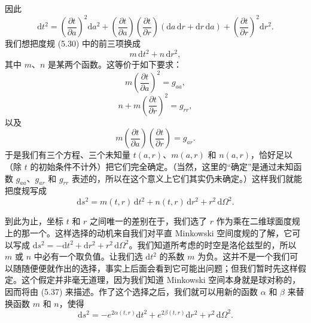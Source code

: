 因此
\begin{equation*}
\mathrm{d}t^2 = \left(\frac{\partial t}{\partial a}\right)^{2}\mathrm{d}a^2 + \left(\frac{\partial t}{\partial a}\right)\left(\frac{\partial t}{\partial r}\right)(\mathrm{d}a\,\mathrm{d}r + \mathrm{d}r\,\mathrm{d}a) + \left(\frac{\partial t}{\partial r}\right)^{2}\mathrm{d}r^2.
\tag{5.32}
\end{equation*}
我们想把度规 (5.30) 中的前三项换成
\begin{equation*}
m\,\mathrm{d}t^2 + n\,\mathrm{d}r^2,
\tag{5.33}
\end{equation*}
其中 $m$、$n$ 是某两个函数。这等价于如下要求：
\begin{equation*}
m\left(\frac{\partial t}{\partial a}\right)^{2} = g_{aa},
\tag{5.34}
\end{equation*}
\begin{equation*}
n + m\left(\frac{\partial t}{\partial r}\right)^{2} = g_{rr},
\tag{5.35}
\end{equation*}
以及
\begin{equation*}
m\left(\frac{\partial t}{\partial a}\right)\left(\frac{\partial t}{\partial r}\right) = g_{ar}.
\tag{5.36}
\end{equation*}
于是我们有三个方程、三个未知量 $t(a, r)$、$m(a, r)$ 和 $n(a, r)$，恰好足以（除 $t$ 的初始条件不计外）把它们完全确定。（当然，这里的“确定”是通过未知函数 $g_{aa}$、$g_{ar}$ 和 $g_{rr}$ 表述的，所以在这个意义上它们其实仍未确定。）这样我们就能把度规写成
\begin{equation*}
\mathrm{d}s^2 = m(t, r)\,\mathrm{d}t^2 + n(t, r)\,\mathrm{d}r^2 + r^2\,\mathrm{d}\Omega^2.
\tag{5.37}
\end{equation*}

到此为止，坐标 $t$ 和 $r$ 之间唯一的差别在于，我们选了 $r$ 作为乘在二维球面度规上的那一个。这样选择的动机来自我们对平直 Minkowski 空间度规的了解，它可以写成 $\mathrm{d}s^2 = -\mathrm{d}t^2 + \mathrm{d}r^2 + r^2\,\mathrm{d}\Omega^2$。我们知道所考虑的时空是洛伦兹型的，所以 $m$ 或 $n$ 中必有一个取负值。让我们选 $\mathrm{d}t^2$ 的系数 $m$ 为负。这并不是一个我们可以随随便便就作出的选择，事实上后面会看到它可能出问题；但我们暂时先这样假定。这个假定并非毫无道理，因为我们知道 Minkowski 空间本身就是球对称的，因而将由 (5.37) 来描述。作了这个选择之后，我们就可以用新的函数 $\alpha$ 和 $\beta$ 来替换函数 $m$ 和 $n$，使得
\begin{equation*}
\mathrm{d}s^2 = -e^{2\alpha(t, r)}\mathrm{d}t^2 + e^{2\beta(t, r)}\mathrm{d}r^2 + r^2\,\mathrm{d}\Omega^2.
\tag{5.38}
\end{equation*}

